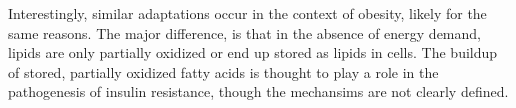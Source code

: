 \documentclass{tufte-handout}
\begin{document}
Interestingly, similar adaptations occur in the context of obesity, likely for the same reasons.  The major difference, is that in the absence of energy demand, lipids are only partially oxidized or end up stored as lipids in cells.  The buildup of stored, partially oxidized fatty acids is thought to play a role in the pathogenesis of insulin resistance, though the mechansims are not clearly defined.






\end{document}
